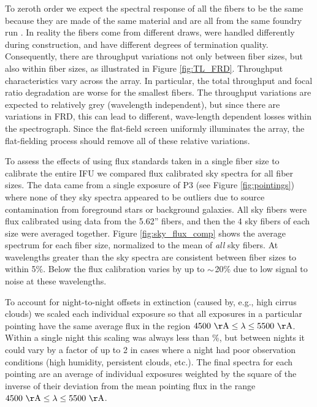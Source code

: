 To zeroth order we expect the spectral response of all the \GP fibers
to be the same because they are made of the same material and are all
from the same foundry run \citep{Wood12}. In reality the \GP fibers
come from different draws, were handled differently during
construction, and have different degrees of termination quality.
Consequently, there are throughput variations not only between fiber
sizes, but also within fiber sizes, as illustrated in Figure
\ref{fig:TL_FRD}.  Throughput characteristics vary across the \GP
array. In particular, the total throughput and focal ratio degradation
are worse for the smallest fibers. The throughput variations are
expected to relatively grey (wavelength independent), but since there
are variations in FRD, this can lead to different, wave-length
dependent losses within the spectrograph. Since the flat-field screen
uniformly illuminates the array, the flat-fielding process should
remove all of these relative variations.

To assess the effects of using flux standards taken in a single fiber
size to calibrate the entire \GP IFU we compared flux calibrated sky
spectra for all fiber sizes. The data came from a single exposure of
P3 (see Figure \ref{fig:pointings}) where none of they sky spectra
appeared to be outliers due to source contamination from foreground
stars or background galaxies.  All sky fibers were flux calibrated
using data from the 5.62'' fibers, and then the 4 sky fibers of each
size were averaged together. Figure \ref{fig:sky_flux_comp} shows the
average spectrum for each fiber size, normalized to the mean of
\emph{all} sky fibers. At wavelengths greater than  the
sky spectra are consistent between fiber sizes to within 5\%. Below
 the flux calibration varies by up to ${\sim}$20\% due
to low signal to noise at these wavelengths.


To account for night-to-night offsets in extinction (caused by, e.g.,
high cirrus clouds) we scaled each individual exposure so that all
exposures in a particular pointing have the same average flux in the
region $\val{4500}{\AA} \leq \lambda \leq \val{5500}{\AA}$. Within a
single night this scaling was always less than \%, but between
nights it could vary by a factor of up to 2 in cases where a night had
poor observation conditions (high humidity, persistent clouds,
etc.). The final spectra for each pointing are an average of
individual exposures weighted by the square of the inverse of their
deviation from the mean pointing flux in the range $\val{4500}{\AA}
\leq \lambda \leq \val{5500}{\AA}$.

